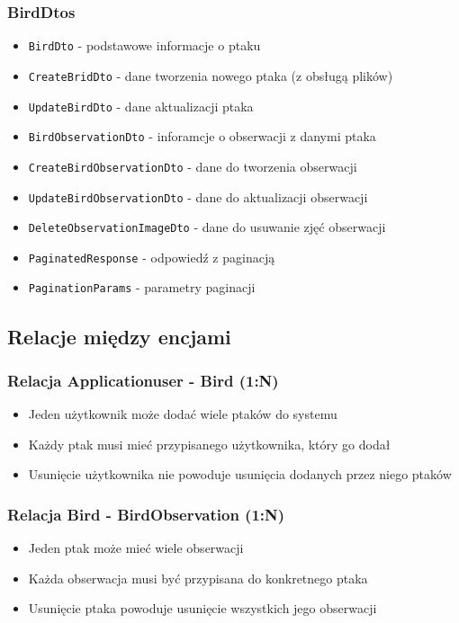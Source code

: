 \subsubsection{BirdDtos}
\begin{itemize}
	\item \texttt{BirdDto} - podstawowe informacje o ptaku
	\item \texttt{CreateBridDto} - dane tworzenia nowego ptaka (z obsługą plików)
	\item \texttt{UpdateBirdDto} - dane aktualizacji ptaka
	\item \texttt{BirdObservationDto} - inforamcje o obserwacji z danymi ptaka
	\item \texttt{CreateBirdObservationDto} - dane do tworzenia obserwacji
	\item \texttt{UpdateBirdObservationDto} - dane do aktualizacji obserwacji
	\item \texttt{DeleteObservationImageDto} - dane do usuwanie zjęć obserwacji
	\item \texttt{PaginatedResponse} - odpowiedź z paginacją
	\item \texttt{PaginationParams} - parametry paginacji 
\end{itemize}

\subsection{Relacje między encjami}

\subsubsection{Relacja Applicationuser - Bird (1:N)}
\begin{itemize}
	\item Jeden użytkownik może dodać wiele ptaków do systemu
	\item Każdy ptak musi mieć przypisanego użytkownika, który go dodał
	\item Usunięcie użytkownika nie powoduje usunięcia dodanych przez niego ptaków
\end{itemize}

\subsubsection{Relacja Bird - BirdObservation (1:N)}
\begin{itemize}
	\item Jeden ptak może mieć wiele obserwacji
	\item Każda obserwacja musi być przypisana do konkretnego ptaka
	\item Usunięcie ptaka powoduje usunięcie wszystkich jego obserwacji
\end{itemize}

